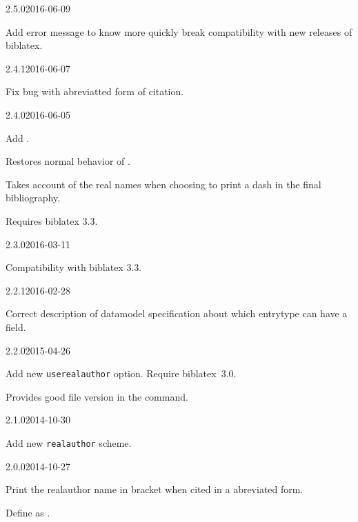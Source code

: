 \documentclass{ltxdockit}[2011/03/25]
\newcommand{\biblatex}{biblatex\xspace}
\begin{document}
\begin{changelog}
\begin{release}{2.5.0}{2016-06-09}
  \item Add error message to know more quickly break compatibility with new releases of biblatex.
\end{release}
  
  \begin{release}{2.4.1}{2016-06-07}
    \item Fix bug with abreviatted form of citation.
  \end{release}
  \begin{release}{2.4.0}{2016-06-05}
    \item Add .
    \item Restores normal behavior of .
    \item Takes account of the real names when choosing to print a dash in the final bibliography.
    \item Requires biblatex 3.3.
  \end{release}

  \begin{release}{2.3.0}{2016-03-11}
  \item Compatibility with biblatex 3.3.
  \end{release}

  \begin{release}{2.2.1}{2016-02-28}
  \item Correct description of datamodel specification about which entrytype can have a  field.
  \end{release}


  \begin{release}{2.2.0}{2015-04-26}
  \item Add new \verb|userealauthor| option. Require \biblatex~3.0. 
  \item Provides good file version in the  command.
  \end{release}

  \begin{release}{2.1.0}{2014-10-30}
  \item Add new \verb|realauthor| scheme. 
  \end{release}


  \begin{release}{2.0.0}{2014-10-27}
  \item Print the realauthor name in bracket when cited in a abreviated form.
  \item Define  as . 
  \end{release}


\end{changelog}
\end{document}
